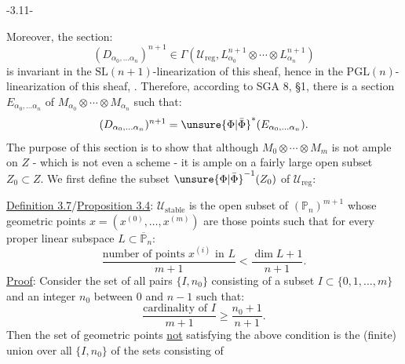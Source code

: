 \begin{center}-3.11-\end{center}
Moreover, the section:
\[
(D_{\alpha_0,\ldots\alpha_n})^{n+1}\in\Gamma(\mathcal U_{\mathrm{reg}},L_{\alpha_0}^{n+1}\otimes\cdots\otimes L_{\alpha_n}^{n+1})
\]
is invariant in the $\mathrm{SL}(n+1)$-linearization of this sheaf, hence in the $\mathrm{PGL}(n)$-linearization of this sheaf, . Therefore, according to SGA 8, \S1, there is a section $E_{\alpha_0,\ldots\alpha_n}$ of $M_{\alpha_0}\otimes\cdots\otimes M_{\alpha_n}$ such that:
\[
(D_{\alpha_0,\ldots\alpha_n})^{n+1}=\unsure{\Phi|\bar\Phi}^{*}(E_{\alpha_0,\ldots\alpha_n}).
\]
 The purpose of this section is to show that although $M_0\otimes\cdots\otimes M_m$ is not ample on $Z$ - which is not even a scheme - it is ample on a fairly large open subset $Z_0\subset Z$. We first define the subset $\unsure{\Phi|\bar\Phi}^{-1}(Z_0)$ of $\mathcal U_{\mathrm{reg}}$:

\uline{Definition 3.7}/\uline{Proposition 3.4}: $\mathcal U_{\mathrm{stable}}$ is the open subset of $(\mathbb P_n)^{m+1}$ whose geometric points $x=(x^{(0)},\ldots,x^{(m)})$ are those points such that for every proper linear subspace $L\subset\overline{\mathbb P}_n$:
\[
\frac{\text{number of points }x^{(i)}\text{ in }L}{m+1}<\frac{\dim L+1}{n+1}.
\]
\uline{Proof}: Consider the set of all pairs $\{I,n_0\}$ consisting of a subset $I\subset\{0,1,\ldots,m\}$ and an integer $n_0$ between 0 and $n-1$ such that:
\[
\frac{\text{cardinality of }I}{m+1}\geq\frac{n_0+1}{n+1}.
\]
Then the set of geometric points \uline{not} satisfying the above condition is the (finite) union over all $\{I,n_0\}$ of the sets consisting of
